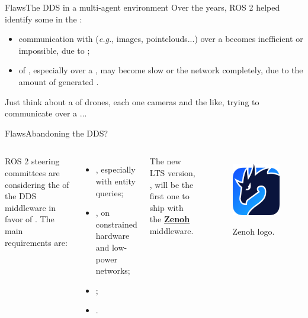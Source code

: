 \begin{frame}{Flaws}{The DDS in a multi-agent environment}
  Over the years, ROS 2 helped identify some  in the :
  \begin{itemize}
    \item communication with  (\emph{e.g.}, images, pointclouds...) over a  becomes inefficient or impossible, due to ;
    \item {} of , especially over a , may become slow or  the network completely, due to the amount of generated .
  \end{itemize}
  Just think about a  of drones, each one cameras and the like, trying to communicate over a ...
\end{frame}
\begin{frame}{Flaws}{Abandoning the DDS?}
  \begin{columns}
    ROS 2 steering committees are considering the  of the DDS middleware in favor of . The main requirements are:
    \begin{itemize}
      \item {}, especially with entity queries;
      \item {}, on constrained hardware and low-power networks;
      \item {};
      \item {}.
    \end{itemize}
    \bigskip
    The new LTS version, , will be the first one to ship with the \href{https://zenoh.io/}{\color{blue}\textbf{\underline{Zenoh}}} middleware.

    \begin{figure}
      \centering
      \includegraphics[width=.65\textwidth]{zenoh}
      \label{fig:zenoh}
      \caption{Zenoh logo.}
    \end{figure}
  \end{columns}
\end{frame}
